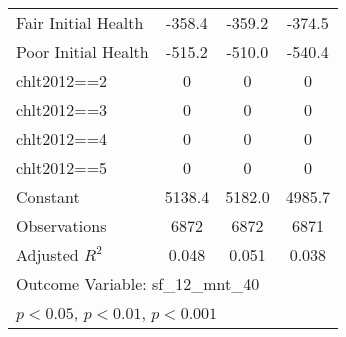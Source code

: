 {\begin{tabular}{l*{3}{c}}
Fair Initial Health&   -358.4\sym{***}&   -359.2\sym{***}&   -374.5\sym{***}\\
Poor Initial Health&   -515.2\sym{***}&   -510.0\sym{***}&   -540.4\sym{***}\\
chlt2012==2     &        0         &        0         &        0         \\
chlt2012==3     &        0         &        0         &        0         \\
chlt2012==4     &        0         &        0         &        0         \\
chlt2012==5     &        0         &        0         &        0         \\
Constant        &   5138.4\sym{***}&   5182.0\sym{***}&   4985.7\sym{***}\\
Observations    &     6872         &     6872         &     6871         \\
Adjusted \(R^{2}\)&    0.048         &    0.051         &    0.038         \\
\multicolumn{4}{l}{\footnotesize Outcome Variable: sf\_12\_mnt\_40}\\
\multicolumn{4}{l}{\footnotesize \sym{*} \(p<0.05\), \sym{**} \(p<0.01\), \sym{***} \(p<0.001\)}\\
\end{tabular}
}
